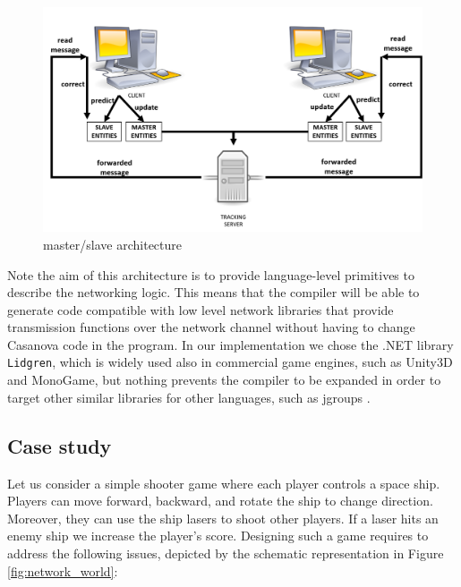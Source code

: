 \begin{figure}
	\centering
	\includegraphics[scale = 0.5]{Figures/masterslave}
	\caption{master/slave architecture}
	\label{fig:masterslave}
\end{figure}

Note the aim of this architecture is to provide language-level primitives to describe the networking logic. This means that the compiler will be able to generate code compatible with low level network libraries that provide transmission functions over the network channel without having to change Casanova code in the program. In our implementation we chose the .NET library \texttt{Lidgren}, which is widely used also in commercial game engines, such as Unity3D and MonoGame, but nothing prevents the compiler to be expanded in order to target other similar libraries for other languages, such as jgroups \cite{ban2002jgroups}.

\subsection{Case study}
Let us consider a simple shooter game where each player controls a space ship. Players can move forward, backward, and rotate the ship to change direction. Moreover, they can use the ship lasers to shoot other players. If a laser hits an enemy ship we increase the player's score. Designing such a game requires to address the following issues, depicted by the schematic representation in Figure \ref{fig:network_world}:

